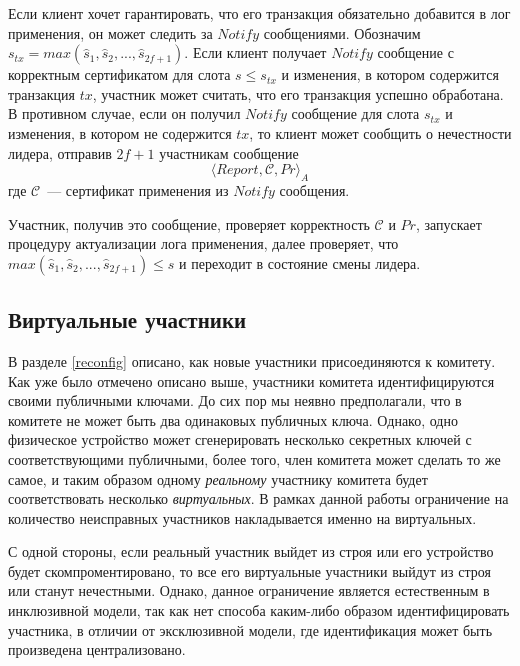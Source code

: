 Если клиент хочет гарантировать, что его транзакция обязательно добавится в лог применения, он может следить за $Notify$ сообщениями. Обозначим $s_{tx}=max(\hat{s}_1,  \hat{s}_2,..., \hat{s}_{2f+1})$. Если клиент получает $Notify$ сообщение с корректным сертификатом для слота $s \le s_{tx}$ и изменения, в котором содержится транзакция $tx$, участник может считать, что его транзакция успешно обработана. В противном случае, если он получил $Notify$ сообщение для слота $s_{tx}$ и изменения, в котором не содержится $tx$, то клиент может сообщить о нечестности лидера, отправив $2f+1$ участникам сообщение
\[ \langle Report, \mathcal{C}, Pr \rangle_A \]
где $\mathcal{C}$~--- сертификат применения из $Notify$ сообщения.

Участник, получив это сообщение, проверяет корректность $\mathcal{C}$ и $Pr$, запускает процедуру актуализации лога применения, далее проверяет, что $max(\hat{s}_1,  \hat{s}_2,..., \hat{s}_{2f+1}) \le s$ и переходит в состояние смены лидера.

\subsection{Виртуальные участники}
В разделе \ref{reconfig} описано, как новые участники присоединяются к комитету. Как уже было отмечено описано выше, участники комитета идентифицируются своими публичными ключами. До сих пор мы неявно предполагали, что в комитете не может быть два одинаковых публичных ключа. Однако, одно физическое устройство может сгенерировать несколько секретных ключей с соответствующими публичными, более того, член комитета может сделать то же самое, и таким образом одному \textit{реальному} участнику комитета будет соответствовать несколько \textit{виртуальных}. В рамках данной работы ограничение на количество неисправных участников накладывается именно на виртуальных.

С одной стороны, если реальный участник выйдет из строя или его устройство будет скомпроментировано, то все его виртуальные участники выйдут из строя или станут нечестными.  Однако, данное ограничение является естественным в инклюзивной модели, так как нет способа каким-либо образом идентифицировать участника, в отличии от эксклюзивной модели, где идентификация может быть произведена централизовано.

